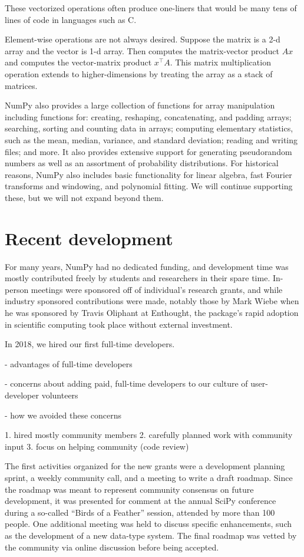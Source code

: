 These vectorized operations often produce one-liners that would be many tens
of lines of code in languages such as C.

Element-wise operations are not always desired.
Suppose the matrix  is a 2-d array and the vector  is 1-d array.
Then  computes the matrix-vector product $Ax$ and
 computes the vector-matrix product $x^\top A$.
This matrix multiplication operation extends to higher-dimensions by
treating the array as a stack of matrices.

NumPy also provides a large collection of functions for array manipulation
including functions for:
creating, reshaping, concatenating, and padding arrays;
searching, sorting and counting data in arrays;
computing elementary statistics, such as the mean, median, variance, and standard deviation;
reading and writing files;
and more.
It also provides extensive support for generating pseudorandom numbers
as well as an assortment of probability distributions.
For historical reasons, NumPy also includes basic functionality for
linear algebra, fast Fourier transforms and windowing,
and polynomial fitting.
We will continue supporting these, but we will not expand beyond them.

\section*{Recent development}

For many years, NumPy had no dedicated funding, and development time
was mostly contributed freely by students and researchers in their
spare time.  In-person meetings were sponsored off of individual's
research grants, and while industry sponsored contributions were made,
notably those by Mark Wiebe when he was sponsored by Travis Oliphant
at Enthought, the package's rapid adoption in scientific
computing took place without external investment.

In 2018, we hired our first full-time developers.

- advantages of full-time developers

- concerns about adding paid, full-time developers to our culture of user-developer volunteers

- how we avoided these concerns

1. hired mostly community members
2. carefully planned work with community input
3. focus on helping community (code review)


The first activities organized for the new grants were a development planning
sprint, a weekly community call, and a meeting to write a draft roadmap.
Since the roadmap was meant to represent community consensus on future
development, it was presented for comment at the annual SciPy
conference during a so-called ``Birds of a Feather'' session, attended
by more than 100 people.  One additional meeting was held to discuss
specific enhancements, such as the development of a new data-type
system.  The final roadmap was vetted by the community via online
discussion before being accepted.

